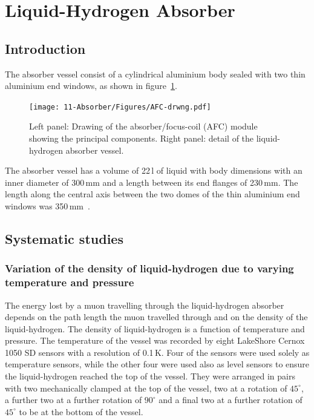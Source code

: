 
\graphicspath{{11-Absorber/Figures/}}

\section{Liquid-Hydrogen Absorber}
\label{Sect:Absorber}

\subsection{Introduction}

The absorber vessel consist of a cylindrical aluminium body sealed with
two thin aluminium end windows, as shown in figure~\ref{Fig:AbsorberVessel:Diag}.
\begin{figure}[htb!]
  \begin{center}
    \texttt{[image: 11-Absorber/Figures/AFC-drwng.pdf]}
  \end{center}
  \caption{
    Left panel: Drawing of the absorber/focus-coil (AFC) module showing the principal components. Right panel: detail of the liquid-hydrogen absorber vessel.
  }
  \label{Fig:AbsorberVessel:Diag}
\end{figure}
The absorber vessel has a volume of 22\,l of liquid with body dimensions with
an inner diameter of 300\,mm and a length between its end
flanges of 230\,mm.  
The length along the central axis between the two domes of the thin aluminium end
windows was 350\,mm~\cite{1748-0221-13-09-T09008}.


\subsection{Systematic studies}

\subsubsection{Variation of the density of liquid-hydrogen due to varying temperature and pressure}
\label{SubSect:Absorber_temperature}

The energy lost by a muon travelling through the liquid-hydrogen absorber depends on the path length the
muon travelled through and on the density of the liquid-hydrogen. The density of liquid-hydrogen is a function of temperature and pressure. 
The temperature of the vessel was recorded by eight LakeShore Cernox 1050 SD sensors with a resolution of 0.1\,K.
Four of the sensors were used solely as temperature sensors, while the other four were used also as level
sensors to ensure the liquid-hydrogen reached the top of the vessel.
They were arranged in pairs
with two mechanically clamped at the  top of the vessel, two at a rotation of ${45}^{\circ}$, a further two at a further rotation of
${90}^{\circ}$ and a final two at a further rotation of ${45}^{\circ}$ to be at the bottom of the vessel.

